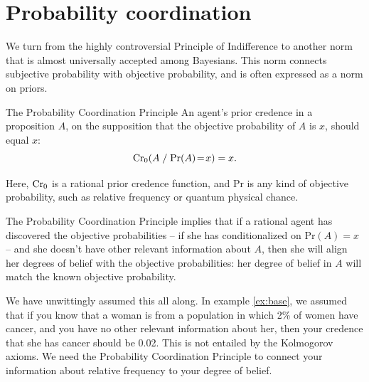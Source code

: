 
\section{Probability coordination}

We turn from the highly controversial Principle of Indifference to another norm
that is almost universally accepted among Bayesians. This norm connects
subjective probability with objective probability, and is often expressed
as a norm on priors.

\begin{genericthm}{The Probability Coordination Principle}
  An agent's prior credence in a proposition $A$, on the supposition that the
  objective probability of $A$ is $x$, should equal $x$:
  \[
    \text{Cr}_0(A \;/\; \text{Pr}(A)\!=\!x) = x.
  \]
\end{genericthm}
%
\noindent%
Here, $\text{Cr}_{0}$ is a rational prior credence function, and Pr is any kind of
objective probability, such as relative frequency or quantum physical chance.

The Probability Coordination Principle implies that if a rational agent has
discovered the objective probabilities -- if she has conditionalized on
$\text{Pr}(A)\!=\!x$ -- and she doesn't have other relevant information about
$A$, then she will align her degrees of belief with the objective probabilities:
her degree of belief in $A$ will match the known objective probability.

We have unwittingly assumed this all along. In example \ref{ex:base}, we assumed
that if you know that a woman is from a population in which 2\% of women have
cancer, and you have no other relevant information about her, then your
credence that she has cancer should be 0.02. This is
not entailed by the Kolmogorov axioms. We need the Probability
Coordination Principle to connect your information about relative frequency to
your degree of belief.

